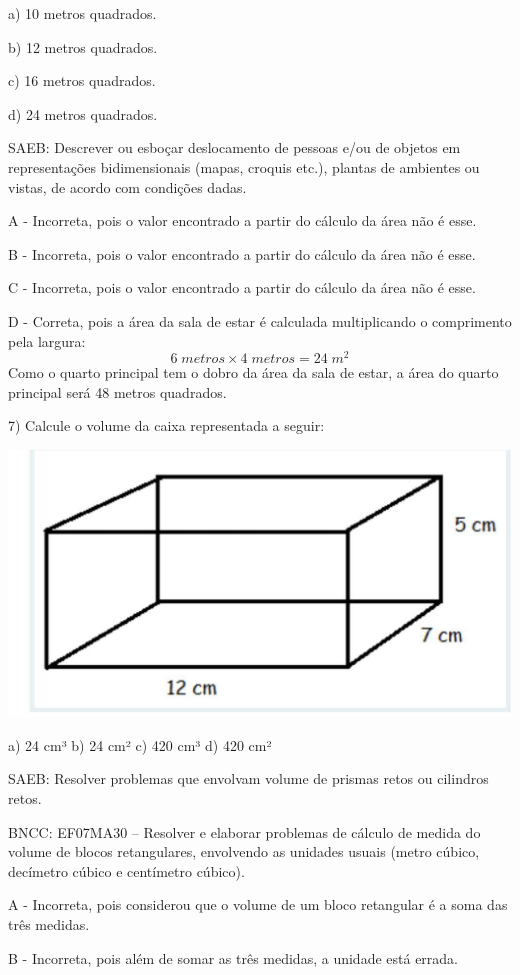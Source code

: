 a) 10 metros quadrados.

b) 12 metros quadrados.

c) 16 metros quadrados.

d) 24 metros quadrados.

SAEB: Descrever ou esboçar deslocamento de pessoas e/ou de objetos em
representações bidimensionais (mapas, croquis etc.), plantas de
ambientes ou vistas, de acordo com condições dadas.

A - Incorreta, pois o valor encontrado a partir do cálculo da área não é
esse.

B - Incorreta, pois o valor encontrado a partir do cálculo da área não é
esse.

C - Incorreta, pois o valor encontrado a partir do cálculo da área não é
esse.

D - Correta, pois a área da sala de estar é calculada multiplicando o
comprimento pela largura:
\[{6 \; metros} \times {4\; metros} = 24\;m^2\] Como o quarto principal
tem o dobro da área da sala de estar, a área do quarto principal será 48
metros quadrados.

7) Calcule o volume da caixa representada a seguir:

\includegraphics{./imgSAEB_7_MAT/media/image99.jpg}

a) 24 cm³ b) 24 cm² c) 420 cm³ d) 420 cm²

SAEB: Resolver problemas que envolvam volume de prismas retos ou
cilindros retos.

BNCC: EF07MA30 -- Resolver e elaborar problemas de cálculo de medida do
volume de blocos retangulares, envolvendo as unidades usuais (metro
cúbico, decímetro cúbico e centímetro cúbico).

A - Incorreta, pois considerou que o volume de um bloco retangular é a
soma das três medidas.

B - Incorreta, pois além de somar as três medidas, a unidade está
errada.

